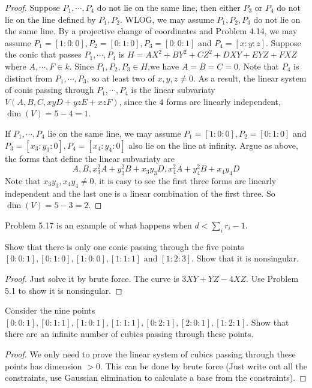 \documentclass{solution}
\begin{document}
\begin{proof}
    Suppose $P_1, \cdots, P_4$ do not lie on the same line, then either $P_3$ or $P_4$ do not lie on the line defined by $P_1, P_2$. WLOG, we may assume $P_1, P_2, P_3$ do not lie on the same line. By a projective change of coordinates and Problem 4.14, we may assume $P_1 = [1:0:0], P_2 = [0:1:0], P_3 = [0:0:1]$ and $P_4 = [x:y:z]$. Suppose the conic that passes $P_1, \cdots, P_4$ is $H = AX^2 + BY^2 + CZ^2 + DXY + EYZ + FXZ$ where $A, \cdots, F \in k$. Since $P_1, P_2, P_3 \in H$,we have $A = B = C = 0$. Note that $P_4$ is distinct from $P_1, \cdots, P_3$, so at least two of $x, y, z \ne 0$. As a result, the linear system of conis passing through $P_1, \cdots, P_4$ is the linear subvariaty $V(A, B, C, xyD + yzE + xzF)$, since the $4$ forms are linearly independent, $\dim(V) = 5 - 4 = 1$.

    If $P_1, \cdots, P_4$ lie on the same line, we may assume $P_1 = [1:0:0], P_2 = [0:1:0]$ and $P_3 = [x_3:y_3:0], P_4 = [x_4:y_4:0]$ also lie on the line at infinity. Argue as above, the forms that define the linear subvariaty are
    $$A, B, x_3^2A + y_3^2B + x_3y_3D, x_4^2A + y_4^2B + x_4y_4D$$
    Note that $x_3y_3, x_4y_4 \ne 0$, it is easy to see the first three forms are linearly independent and the last one is a linear combination of the first three. So $\dim(V) = 5 - 3 = 2$.
\end{proof}

Problem 5.17 is an example of what happens when $d \lt \sum\limits_{i} r_i - 1$.

\begin{problem}{5.18}
    Show that there is only one conic passing through the five points $[0:0:1], [0:1:0], [1:0:0], [1:1:1]$ and $[1:2:3]$. Show that it is nonsingular.
\end{problem}

\begin{proof}
    Just solve it by brute force. The curve is $3XY + YZ - 4XZ$. Use Problem 5.1 to show it is nonsingular.
\end{proof}

\begin{problem}{5.19}
    Consider the nine points $[0:0:1], [0:1:1], [1:0:1], [1:1:1], [0:2:1], [2:0:1], [1:2:1]$. Show that there are an infinite number of cubics passing through these points.
\end{problem}

\begin{proof}
    We only need to prove the linear system of cubics passing through these points has dimension $\gt 0$. This can be done by brute force (Just write out all the constraints, use Gaussian elimination to calculate a base from the constraints).
\end{proof}
\end{document}
